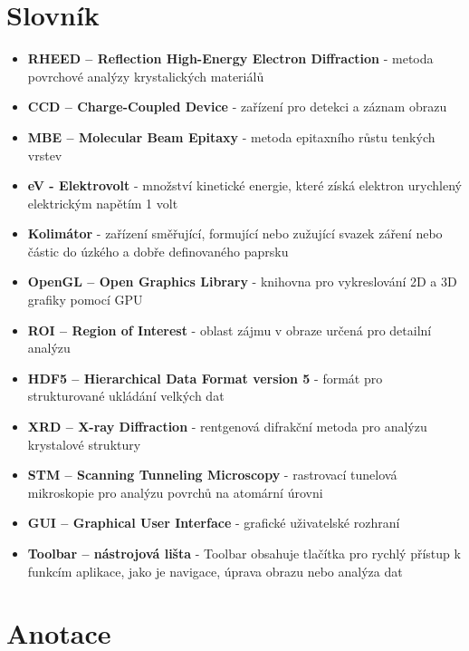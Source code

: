 \documentclass[a4paper,11pt]{article}
\begin{document}
\section{Slovník}
\begin{itemize}
\item \textbf{RHEED – Reflection High-Energy Electron Diffraction} - metoda povrchové analýzy krystalických materiálů\\
\item \textbf{CCD – Charge-Coupled Device} - zařízení pro detekci a záznam obrazu\\
\item \textbf{MBE – Molecular Beam Epitaxy} - metoda epitaxního růstu tenkých vrstev\\
\item \textbf{eV - Elektrovolt} - množství kinetické energie, které získá elektron urychlený elektrickým napětím 1 volt
\item \textbf{Kolimátor} - zařízení směřující, formující nebo zužující svazek záření nebo částic do úzkého a dobře definovaného paprsku
\item \textbf{OpenGL – Open Graphics Library} - knihovna pro vykreslování 2D a 3D grafiky pomocí GPU\\
\item \textbf{ROI – Region of Interest} - oblast zájmu v obraze určená pro detailní analýzu\\
\item \textbf{HDF5 – Hierarchical Data Format version 5} - formát pro strukturované ukládání velkých dat\\
\item \textbf{XRD – X-ray Diffraction} - rentgenová difrakční metoda pro analýzu krystalové struktury\\
\item \textbf{STM – Scanning Tunneling Microscopy} - rastrovací tunelová mikroskopie pro analýzu povrchů na atomární úrovni\\
\item \textbf{GUI – Graphical User Interface} - grafické uživatelské rozhraní\\
\item \textbf{Toolbar – nástrojová lišta} - Toolbar obsahuje tlačítka pro rychlý přístup k funkcím aplikace, jako je navigace, úprava obrazu nebo analýza dat
\end{itemize}
\newpage

\section*{Anotace}
\end{document}
